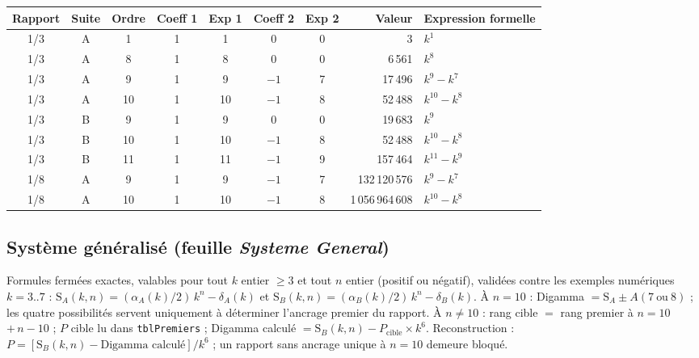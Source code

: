 \documentclass[11pt,a4paper]{article}
\newcommand{\SA}{\mathrm{S}_A}
\newcommand{\SB}{\mathrm{S}_B}
\begin{document}
\begin{center}\small
\begin{tabular}{@{}c c c c c c c r l@{}}
\toprule
\rowcolor{spectralgris}
Rapport & Suite & Ordre & Coeff 1 & Exp 1 & Coeff 2 & Exp 2 & Valeur & Expression formelle \\
\midrule
1/3 & A & 1 & 1 & 1 & 0 & 0 & 3 & $k^{1}$ \\
1/3 & A & 8 & 1 & 8 & 0 & 0 & 6\,561 & $k^{8}$ \\
1/3 & A & 9 & 1 & 9 & $-1$ & 7 & 17\,496 & $k^{9} - k^{7}$ \\
1/3 & A & 10 & 1 & 10 & $-1$ & 8 & 52\,488 & $k^{10} - k^{8}$ \\
1/3 & B & 9 & 1 & 9 & 0 & 0 & 19\,683 & $k^{9}$ \\
1/3 & B & 10 & 1 & 10 & $-1$ & 8 & 52\,488 & $k^{10} - k^{8}$ \\
1/3 & B & 11 & 1 & 11 & $-1$ & 9 & 157\,464 & $k^{11} - k^{9}$ \\
1/8 & A & 9 & 1 & 9 & $-1$ & 7 & 132\,120\,576 & $k^{9} - k^{7}$ \\
1/8 & A & 10 & 1 & 10 & $-1$ & 8 & 1\,056\,964\,608 & $k^{10} - k^{8}$ \\
\bottomrule
\end{tabular}
\end{center}

\subsection{Système généralisé (feuille \emph{Systeme General})}

Formules fermées exactes, valables pour tout $k$ entier $\ge 3$ et tout $n$
entier (positif ou négatif), validées contre les exemples numériques $k=3..7$ :
$\SA(k,n) = (\alpha_A(k)/2)\,k^{n} - \delta_A(k)$ et
$\SB(k,n) = (\alpha_B(k)/2)\,k^{n} - \delta_B(k)$. À $n=10$ : Digamma $= \SA
\pm A(7\ \text{ou}\ 8)$ ; les quatre possibilités servent uniquement à
déterminer l'ancrage premier du rapport. À $n \neq 10$ : rang cible $=$ rang
premier à $n=10$ $+\,n-10$ ; $P$ cible lu dans \texttt{tblPremiers} ; Digamma
calculé $= \SB(k,n) - P_{\text{cible}} \times k^{6}$. Reconstruction :
$P = [\SB(k,n) - \text{Digamma calculé}]/k^{6}$ ; un rapport sans ancrage
unique à $n=10$ demeure bloqué.
\end{document}
